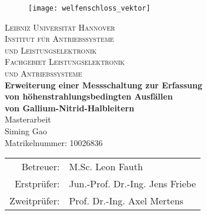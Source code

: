 \begin{titlepage}
\enlargethispage{2.0cm}

\begin{center}

\vspace*{-2cm}


   \begin{figure}[h]
   \centering
       \texttt{[image: welfenschloss\_vektor]}
   \end{figure}

\vspace{1cm}

    {\LARGE \textsc{Leibniz Universität Hannover}}\\[1.0cm]

    {\Large \textsc{Institut für Antriebssysteme}} \\[0.2cm]
    {\Large \textsc{und Leistungselektronik}} \\ [0.4cm]

    {\Large \textsc{Fachgebiet Leistungselektronik}} \\ [0.2cm]
		{\Large \textsc{und Antriebssysteme}} \\ [1.7cm]

    {\Large \textbf{Erweiterung einer Messschaltung zur Erfassung\\[0.3cm]von höhenstrahlungsbedingten Ausfällen\\[0.3cm]von Gallium-Nitrid-Halbleitern } } \\ [3cm]

    {\Large Masterarbeit} \\ [1.5cm]

    {\large Siming Gao} \\
    {Matrikelnummer: 10026836 } \\ [1.5cm]

    \begin{tabular}{rl}
      Betreuer:    & M.Sc. Leon Fauth\\
      Erstprüfer:  & Jun.-Prof. Dr.-Ing. Jens Friebe\\
      Zweitprüfer: & Prof. Dr.-Ing. Axel Mertens
    \end{tabular}

\end{center}

\end{titlepage}
